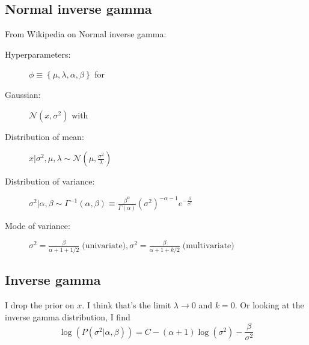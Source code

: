 \documentclass{article}
\newcommand{\Normal}{{\mathcal{N}}}
\begin{document}
\subsection*{Normal inverse gamma}

From Wikipedia on Normal inverse gamma:

\begin{description}
\item[Hyperparameters:] $\phi \equiv \left\{\mu, \lambda, \alpha, \beta
  \right\}$ for
\item[Gaussian:] $\Normal(x,\sigma^2)$ with
\item[Distribution of mean:] $x|\sigma^2, \mu, \lambda \sim
  \Normal\left(\mu, \frac{\sigma^2}{\lambda} \right)$
\item[Distribution of variance:] $\sigma^2 | \alpha, \beta \sim
  \Gamma^{-1}(\alpha, \beta) \equiv
  \frac{\beta^\alpha}{\Gamma(\alpha)} \left( \sigma^2
  \right)^{-\alpha - 1} e^{-\frac{\beta}{\sigma^2}}$
\item[Mode of variance:]
  $ \sigma ^{2}={\frac {\beta }{\alpha +1+1/2}}\;{\textrm
    {(univariate)}},\sigma ^{2}={\frac {\beta }{\alpha
      +1+k/2}}\;{\textrm {(multivariate)}}$
\end{description}

\subsection*{Inverse gamma}

I drop the prior on $x$.  I think that's the limit
$\lambda \rightarrow 0$ and $k=0$.  Or looking at the inverse gamma
distribution, I find
\begin{equation}
  \label{eq:LogPriorSigmaSquare}
  \log\left( P(\sigma^2|\alpha, \beta) \right) = C -
  (\alpha+1)\log(\sigma^2) - \frac{\beta}{\sigma^2}
\end{equation}
\end{document}
